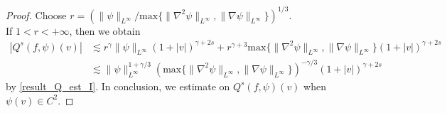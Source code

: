 \documentclass[10pt,a4paper]{amsart}
\begin{document}
\begin{proof}
\noindent Choose $r=(\|\psi\|_{L^{\infty}}/\text{max}\{\|\nabla^2 \psi\|_{L^\infty}, \|\nabla \psi\|_{L^\infty} \})^{1/3}.$\\
\noindent If $1<r<+\infty$, then we obtain
\begin{align*}
      |Q^{s}(f,\psi)(v)| &\lesssim r^{\gamma}\|\psi\|_{L^{\infty}}(1+|v|)^{\gamma+2s} + r^{\gamma+3}\text{max}\{\|\nabla^2 \psi\|_{L^\infty}, \|\nabla \psi\|_{L^\infty} \}(1+|v|)^{\gamma+2s}\\
     &\lesssim  \|\psi\|_{L^{\infty}}^{1+\gamma/3}(\text{max}\{\|\nabla^2 \psi\|_{L^\infty}, \|\nabla \psi\|_{L^\infty} \})^{-\gamma/3}(1+|v|)^{\gamma+2s}
\end{align*} by \eqref{result_Q_est_I}. In conclusion, we estimate on $Q^{s}(f,\psi)(v)$ when  $\psi(v)\in C^2.$ 
\end{proof} \vspace{2mm}
\end{document}
